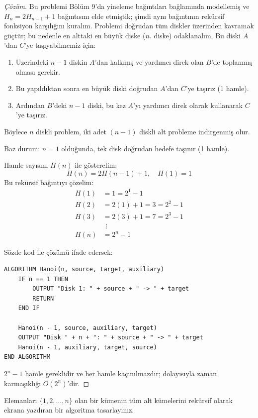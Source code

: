 \begin{proof}[Çözüm]
Bu problemi Bölüm 9'da yineleme bağıntıları bağlamında modellemiş ve $H_n = 2H_{n-1} + 1$ bağıntısını elde etmiştik; şimdi aynı bağıntının rekürsif fonksiyon karşılığını kuralım. Problemi doğrudan tüm diskler üzerinden kavramak güçtür; bu nedenle en alttaki en büyük diske ($n$. diske) odaklanalım. Bu diski $A$'dan $C$'ye taşıyabilmemiz için:
\begin{enumerate}
    \item Üzerindeki $n-1$ diskin $A$'dan kalkmış ve yardımcı direk olan $B$'de toplanmış olması gerekir.
    \item Bu yapıldıktan sonra en büyük diski doğrudan $A$'dan $C$'ye taşırız (1 hamle).
    \item Ardından $B$'deki $n-1$ diski, bu kez $A$'yı yardımcı direk olarak kullanarak $C$'ye taşırız.
\end{enumerate}

Böylece $n$ diskli problem, iki adet $(n-1)$ diskli alt probleme indirgenmiş olur.

Baz durum: $n=1$ olduğunda, tek disk doğrudan hedefe taşınır (1 hamle).

Hamle sayısını $H(n)$ ile gösterelim:
\[
H(n) = 2 H(n-1) + 1, \quad H(1) = 1
\]
Bu rekürsif bağıntıyı çözelim:
\begin{align*}
H(1) &= 1 = 2^1 - 1 \\
H(2) &= 2(1) + 1 = 3 = 2^2 - 1 \\
H(3) &= 2(3) + 1 = 7 = 2^3 - 1 \\
&\ \ \vdots \\
H(n) &= 2^n - 1
\end{align*}

Sözde kod ile çözümü ifade edersek:
\begin{lstlisting}
ALGORITHM Hanoi(n, source, target, auxiliary)
    IF n == 1 THEN
        OUTPUT "Disk 1: " + source + " -> " + target
        RETURN
    END IF

    Hanoi(n - 1, source, auxiliary, target)
    OUTPUT "Disk " + n + ": " + source + " -> " + target
    Hanoi(n - 1, auxiliary, target, source)
END ALGORITHM\end{lstlisting}
$2^n - 1$ hamle gereklidir ve her hamle kaçınılmazdır; dolayısıyla zaman karmaşıklığı $O(2^n)$'dir.
\end{proof}

\begin{example}
Elemanları $\{1, 2, \dots, n\}$ olan bir kümenin tüm alt kümelerini rekürsif olarak ekrana yazdıran bir algoritma tasarlayınız.
\end{example}

